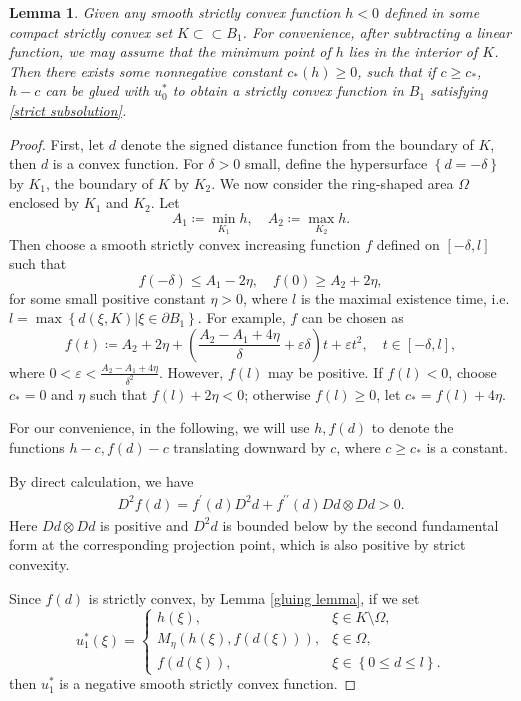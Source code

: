 \documentclass[reqno]{amsart}
\newtheorem{lemma}[theorem]{Lemma}
\theoremstyle{remark}
\theoremstyle{definition}
\numberwithin{equation}{section}
\begin{document}
\begin{lemma}\label{13.3}
    Given any smooth strictly convex function $h<0$ defined in some compact strictly convex set $K \subset \subset B_1$. For convenience, after subtracting a linear function, we may assume that the minimum point of $h$ lies in the interior of $K$. Then there exists some nonnegative constant $c_*(h) \geqslant 0$, such that if $c \geqslant c_*$, $h - c$ can be glued with $u_0^*$ to obtain a strictly convex function in $B_1$ satisfying \eqref{strict subsolution}.
\end{lemma}
\begin{proof}
    First, let $d$ denote the signed distance function from the boundary of $K$, then $d$ is a convex function. For $\delta>0$ small, define the hypersurface $\left\{ d = -\delta \right\}$ by $K_1$, the boundary of $K$ by $K_2$. We now consider the ring-shaped area $\Omega$ enclosed by $K_1$ and $K_2$. 
    Let
    \[
    A_1 \coloneqq \min_{K_1} h, \quad A_2 \coloneqq \max_{K_2} h.
    \]
    Then choose a smooth strictly convex increasing function $f$ defined on $[-\delta, l]$ such that
    \[
    f(-\delta) \leqslant A_1 - 2\eta, \quad f(0) \geqslant A_2 + 2\eta, 
    \]
    for some small positive constant $\eta>0$, where $l$ is the maximal existence time, i.e. $l = \max\left\{ d(\xi, K) | \xi \in \partial B_1 \right\}$. For example, $f$ can be chosen as
    \[ 
    f(t) \coloneqq A_2 + 2\eta + \left(\frac{A_2 - A_1 + 4\eta}{\delta} + \varepsilon\delta\right)t + \varepsilon t^2, \quad t \in [-\delta,l], 
    \]
    where $0< \varepsilon < \frac{A_2 - A_1 + 4\eta}{\delta^2}$. However, $f(l)$ may be positive. If $f(l) < 0$, choose $c_* = 0$ and $\eta$ such that $f(l) + 2\eta < 0$; otherwise $f(l)\geqslant 0$, let $c_* = f(l) + 4\eta$.

    For our convenience, in the following, we will use $h, f(d)$ to denote the functions $h-c, f(d)-c$ translating downward by $c$, where $c \geqslant c_*$ is a constant.
    
    By direct calculation, we have 
    \begin{align*}
        D^2 f(d) = f^{\prime}(d) D^2 d + f^{\prime \prime}(d) D d \otimes D d > 0.
    \end{align*}
    Here $D d \otimes D d$ is positive and $D^2 d$ is bounded below by the second fundamental form at the corresponding projection point, which is also positive by strict convexity.
    
    Since $f(d)$ is strictly convex, by Lemma \ref{gluing lemma}, if we set
    \[
    {u}^*_1(\xi) = 
    \begin{cases}
    h(\xi), & \xi \in K \setminus \Omega, \\
    M_{\eta}(h(\xi), f(d(\xi))), & \xi \in \Omega, \\
    f(d(\xi)), & \xi \in \left\{ 0 \leqslant d \leqslant l \right\}.
    \end{cases}
    \]
    then ${u}^*_1$ is a negative smooth strictly convex function.


\end{proof}
\end{document}
